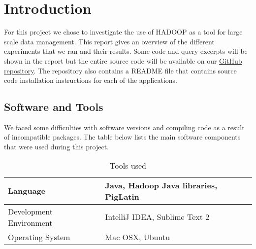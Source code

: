 \documentclass[Intro.tex]{subfiles}
\begin{document}
\section{Introduction}
For this project we chose to investigate the use of HADOOP as a tool for large scale data management. This report gives an overview of the different experiments that we ran and their results. Some code and query excerpts will be shown in the report but the entire source code will be available on our \href{https://github.com/bouke-nederstigt/webdatamanagement}{GitHub repository}. The repository also contains a README file that contains source code installation instructions for each of the applications.

\subsection{Software and Tools}
We faced some difficulties with software versions and compiling code as a result of incompatible packages. The table below lists the main software components that were used during this project. 

\begin{savenotes}
\begin{table}[H]
\centering
\caption{Tools used}
\label{tab:tools}
\begin{tabular}{ l|l }
  \hline
  Language & Java, Hadoop Java libraries, PigLatin \\ 
  \hline
  Development Environment & IntelliJ IDEA, Sublime Text 2 \\ \hline
Operating System & Mac OSX, Ubuntu \\ \hline  
\end{tabular}
\end{table}
\end{savenotes}
\end{document}
